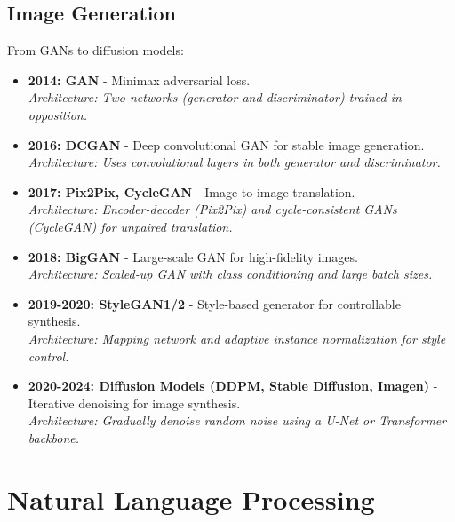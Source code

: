 \documentclass{article}
\begin{document}
\subsection{Image Generation}
From GANs to diffusion models:
\begin{itemize}[leftmargin=1.5em]
    \item \textbf{2014: GAN} - Minimax adversarial loss. \\
        \textit{Architecture: Two networks (generator and discriminator) trained in opposition.}
    \item \textbf{2016: DCGAN} - Deep convolutional GAN for stable image generation. \\
        \textit{Architecture: Uses convolutional layers in both generator and discriminator.}
    \item \textbf{2017: Pix2Pix, CycleGAN} - Image-to-image translation. \\
        \textit{Architecture: Encoder-decoder (Pix2Pix) and cycle-consistent GANs (CycleGAN) for unpaired translation.}
    \item \textbf{2018: BigGAN} - Large-scale GAN for high-fidelity images. \\
        \textit{Architecture: Scaled-up GAN with class conditioning and large batch sizes.}
    \item \textbf{2019-2020: StyleGAN1/2} - Style-based generator for controllable synthesis. \\
        \textit{Architecture: Mapping network and adaptive instance normalization for style control.}
    \item \textbf{2020-2024: Diffusion Models (DDPM, Stable Diffusion, Imagen)} - Iterative denoising for image synthesis. \\
        \textit{Architecture: Gradually denoise random noise using a U-Net or Transformer backbone.}
\end{itemize}

\section{Natural Language Processing}
\end{document}
